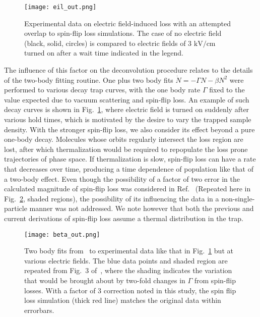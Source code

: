 \documentclass[%
 reprint,
 amsmath,amssymb,
 aps,
pra,
]{revtex4-1}
\begin{document}
\begin{figure}[t]
\texttt{[image: eil\_out.png]}
\caption{Experimental data on electric field-induced loss with an attempted overlap to spin-flip loss simulations. The case of no electric field (black, solid, circles) is compared to electric fields of $3\text{ kV/cm}$ turned on after a wait time indicated in the legend.
\label{fig:eil}}
\end{figure}

The influence of this factor on the deconvolution procedure relates to the details of the two-body fitting routine.
One plus two body fits $\dot{N}=-\Gamma N-\beta N^2$ were performed to various decay trap curves, with the one body rate $\Gamma$ fixed to the value expected due to vacuum scattering and spin-flip loss.
An example of such decay curves is shown in Fig.~\ref{fig:eil}, where electric field is turned on suddenly after various hold times, which is motivated by the desire to vary the trapped sample density.
With the stronger spin-flip loss, we also consider its effect beyond a pure one-body decay. Molecules whose orbits regularly intersect the loss region are lost, after which thermalization would be required to repopulate the loss prone trajectories of phase space. If thermalization is slow, spin-flip loss can have a rate that decreases over time, producing a time dependence of population like that of a two-body effect.
Even though the possibility of a factor of two error in the calculated magnitude of spin-flip loss was considered in Ref.~\cite{Stuhl2013} (Repeated here in Fig.~\ref{fig:beta}, shaded regions), the possibility of its influencing the data in a non-single-particle manner was not addressed. We note however that both the previous and current derivations of spin-flip loss assume a thermal distribution in the trap.

\begin{figure}[t]
\texttt{[image: beta\_out.png]}
\caption{Two body fits from~\cite{Stuhl2013} to experimental data like that in Fig.~\ref{fig:eil} but at various electric fields. The blue data points and shaded region are repeated from Fig.~3 of~\cite{Stuhl2013}, where the shading indicates the variation that would be brought about by two-fold changes in $\Gamma$ from spin-flip losses. With a factor of 3 correction noted in this study, the spin flip loss simulation (thick red line) matches the original data within errorbars.\label{fig:beta}}
\end{figure}
\end{document}
